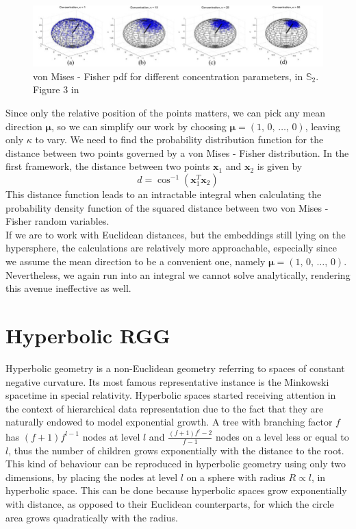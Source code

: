\documentclass[12pt]{report}
\newcommand{\bs}{\boldsymbol}
\newcommand{\mb}[1]{\mathbb{#1}}
\renewcommand{\bs}{\boldsymbol}
\begin{document}
\begin{figure}[!ht]
    \centering
    \includegraphics[width = 1\textwidth]{vonMises.jpg}
    \caption{von Mises - Fisher pdf for different concentration parameters, in $\mb{S}_2$. Figure 3 in~\parencite{vonMisesFig}}
\end{figure}

Since only the relative position of the points matters, we can pick any mean direction $\bs{\mu}$, so we can simplify our work by choosing $\bs{\mu} = (1,\,0,\,\dots,\,0)$, leaving only $\kappa$ to vary. We need to find the probability distribution function for the distance between two points governed by a von Mises - Fisher distribution. In the first framework, the distance between two points $\bs{x}_1$ and $\bs{x}_2$ is given by
\begin{equation}
    d = \cos^{-1}(\bs{x}_1^T\bs{x}_2)
\end{equation}
This distance function leads to an intractable integral when calculating the probability density function of the squared distance between two von Mises - Fisher random variables. \\

If we are to work with Euclidean distances, but the embeddings still lying on the hypersphere, the calculations are relatively more approachable, especially since we assume the mean direction to be a convenient one, namely $\bs{\mu} = (1,\,0,\,\dots,\,0)$. Nevertheless, we again run into an integral we cannot solve analytically, rendering this avenue ineffective as well. \\

\section{Hyperbolic RGG}

Hyperbolic geometry is a non-Euclidean geometry referring to spaces of constant negative curvature. Its most famous representative instance is the Minkowski spacetime in special relativity. Hyperbolic spaces started receiving attention in the context of hierarchical data representation due to the fact that they are naturally endowed to model exponential growth. A tree with branching factor $f$ has $(f + 1)f^{l - 1}$ nodes at level $l$ and $\frac{(f+1)f^l-2}{f-1}$ nodes on a level less or equal to $l$, thus the number of children grows exponentially with the distance to the root. This kind of behaviour can be reproduced in hyperbolic geometry using only two dimensions, by placing the nodes at level $l$ on a sphere with radius $R \propto l$, in hyperbolic space. This can be done because hyperbolic spaces grow exponentially with distance, as opposed to their Euclidean counterparts, for which the circle area grows quadratically with the radius. \\
\end{document}
